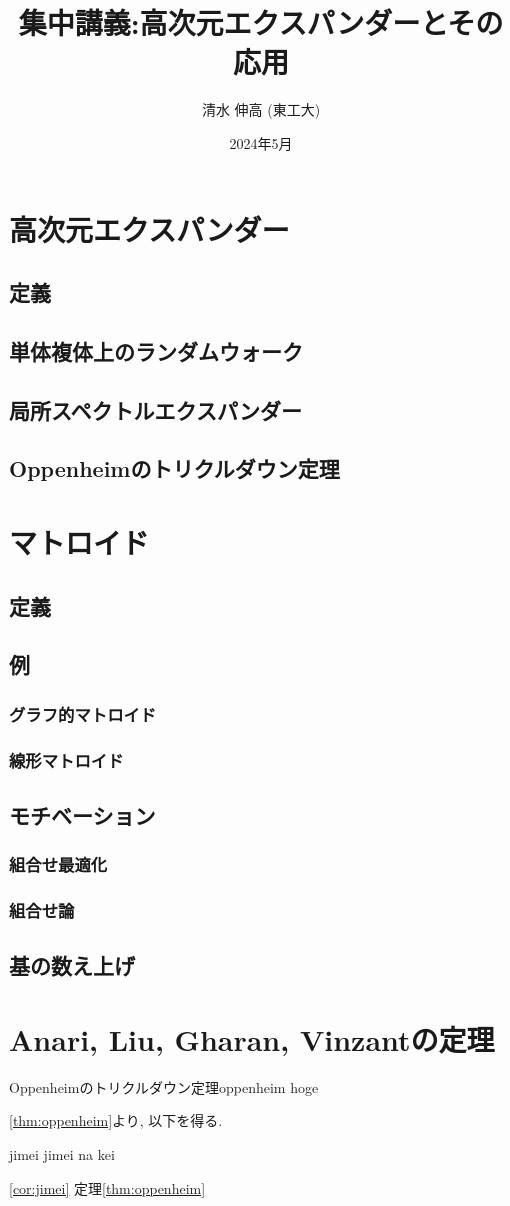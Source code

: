\documentclass[11pt]{article}
\title{集中講義:高次元エクスパンダーとその応用}
\author{清水 伸高 (東工大)}
\date{2024年5月}
\begin{document}
\maketitle
\tableofcontents


\section{高次元エクスパンダー}
\subsection{定義}
\subsection{単体複体上のランダムウォーク}
\subsection{局所スペクトルエクスパンダー}
\subsection{Oppenheimのトリクルダウン定理}

\section{マトロイド}
\subsection{定義}
\subsection{例}
\subsubsection{グラフ的マトロイド}
\subsubsection{線形マトロイド}
\subsection{モチベーション}
\subsubsection{組合せ最適化}
\subsubsection{組合せ論}
\subsection{基の数え上げ}

\section{Anari, Liu, Gharan, Vinzantの定理}


\begin{theorem}{Oppenheimのトリクルダウン定理}{oppenheim}
    hoge
\end{theorem}
\newpage
\cref{thm:oppenheim}より, 以下を得る.
\begin{corollary}{}{jimei}
    jimei na kei
\end{corollary}
\cref{cor:jimei}
定理\ref{thm:oppenheim}
\end{document}

